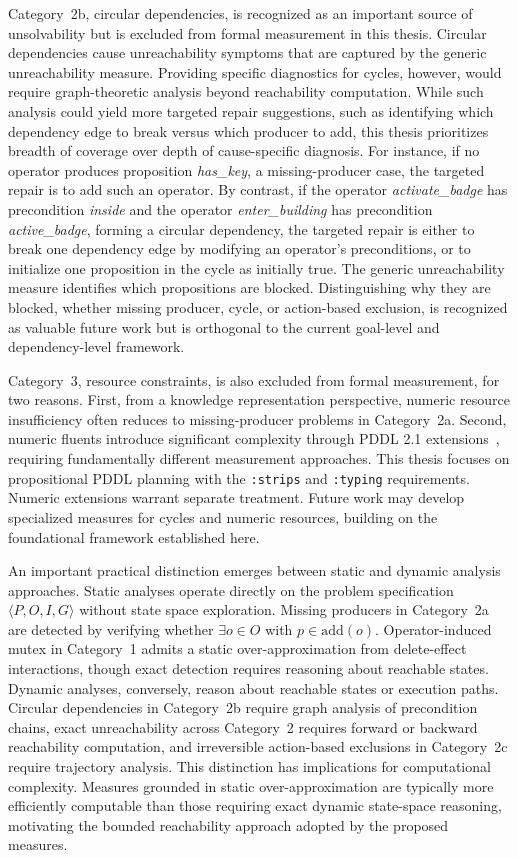 Category~2b, circular dependencies, is recognized as an important source of unsolvability but is excluded from formal measurement in this thesis. Circular dependencies cause unreachability symptoms that are captured by the generic unreachability measure. Providing specific diagnostics for cycles, however, would require graph-theoretic analysis beyond reachability computation. While such analysis could yield more targeted repair suggestions, such as identifying which dependency edge to break versus which producer to add, this thesis prioritizes breadth of coverage over depth of cause-specific diagnosis. For instance, if no operator produces proposition \textit{has\_key}, a missing-producer case, the targeted repair is to add such an operator. By contrast, if the operator \textit{activate\_badge} has precondition \textit{inside} and the operator \textit{enter\_building} has precondition \textit{active\_badge}, forming a circular dependency, the targeted repair is either to break one dependency edge by modifying an operator's preconditions, or to initialize one proposition in the cycle as initially true. The generic unreachability measure identifies which propositions are blocked. Distinguishing why they are blocked, whether missing producer, cycle, or action-based exclusion, is recognized as valuable future work but is orthogonal to the current goal-level and dependency-level framework.

Category~3, resource constraints, is also excluded from formal measurement, for two reasons. First, from a knowledge representation perspective, numeric resource insufficiency often reduces to missing-producer problems in Category~2a. Second, numeric fluents introduce significant complexity through \ac{PDDL} 2.1 extensions~\cite{Fox2003}, requiring fundamentally different measurement approaches. This thesis focuses on propositional \ac{PDDL} planning with the \texttt{:strips} and \texttt{:typing} requirements. Numeric extensions warrant separate treatment. Future work may develop specialized measures for cycles and numeric resources, building on the foundational framework established here.

An important practical distinction emerges between static and dynamic analysis approaches. Static analyses operate directly on the problem specification $\langle P, O, I, G \rangle$ without state space exploration. Missing producers in Category~2a are detected by verifying whether $\exists o \in O$ with $p \in \text{add}(o)$. Operator-induced mutex in Category~1 admits a static over-approximation from delete-effect interactions, though exact detection requires reasoning about reachable states. Dynamic analyses, conversely, reason about reachable states or execution paths. Circular dependencies in Category~2b require graph analysis of precondition chains, exact unreachability across Category~2 requires forward or backward reachability computation, and irreversible action-based exclusions in Category~2c require trajectory analysis. This distinction has implications for computational complexity. Measures grounded in static over-approximation are typically more efficiently computable than those requiring exact dynamic state-space reasoning, motivating the bounded reachability approach adopted by the proposed measures.

